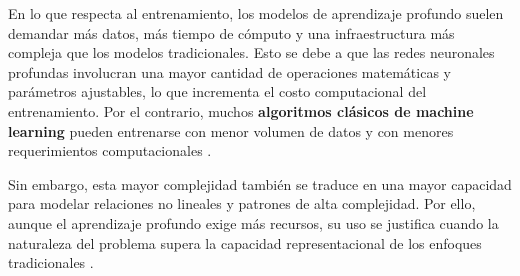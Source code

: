 En lo que respecta al entrenamiento, los modelos de aprendizaje profundo suelen demandar más datos, más tiempo de cómputo y una infraestructura más compleja que los modelos tradicionales. Esto se debe a que las redes neuronales profundas involucran una mayor cantidad de operaciones matemáticas y parámetros ajustables, lo que incrementa el costo computacional del entrenamiento. Por el contrario, muchos \textbf{algoritmos clásicos de machine learning} pueden entrenarse con menor volumen de datos y con menores requerimientos computacionales \cite{aws2026ml_vs_dl}.

Sin embargo, esta mayor complejidad también se traduce en una mayor capacidad para modelar relaciones no lineales y patrones de alta complejidad. Por ello, aunque el aprendizaje profundo exige más recursos, su uso se justifica cuando la naturaleza del problema supera la capacidad representacional de los enfoques tradicionales \cite{aws2026ml_vs_dl}.